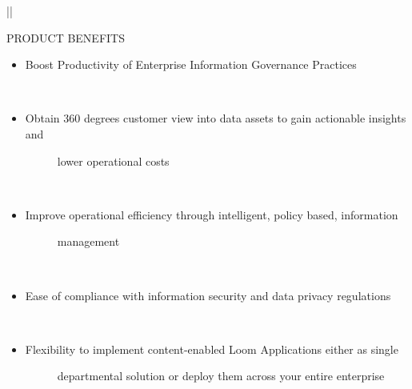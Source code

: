 \documentclass[letterpaper,10pt,english]{sphinxhowto}
\begin{document}
\begin{savenotes}\sphinxattablestart
\centering
\begin{tabular}[t]{|*{1}{|}}
\hline

PRODUCT BENEFITS
\\
\hline\begin{itemize}
\item {} 
Boost Productivity of Enterprise Information Governance Practices

\end{itemize}
\\
\hline\begin{itemize}
\item {} \begin{description}
\item[{Obtain 360 degrees customer view into data assets to gain actionable insights and}] \leavevmode
lower operational costs

\end{description}

\end{itemize}
\\
\hline\begin{itemize}
\item {} \begin{description}
\item[{Improve operational efficiency through intelligent, policy based, information}] \leavevmode
management

\end{description}

\end{itemize}
\\
\hline\begin{itemize}
\item {} 
Ease of compliance with information security and data privacy regulations

\end{itemize}
\\
\hline\begin{itemize}
\item {} \begin{description}
\item[{Flexibility to implement content-enabled Loom Applications either as single}] \leavevmode
departmental solution or deploy them across your entire enterprise

\end{description}

\end{itemize}
\\
\hline
\end{tabular}
\par
\sphinxattableend\end{savenotes}
\end{document}
